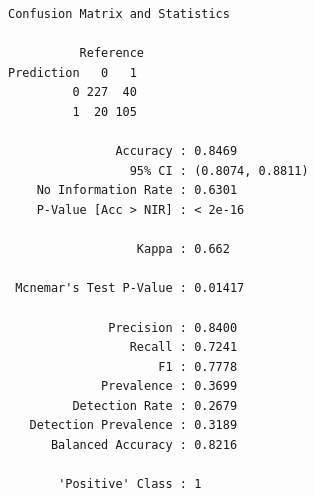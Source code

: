 \documentclass[
  letterpaper,
  DIV=11,
  numbers=noendperiod]{scrartcl}
\begin{document}
\begin{verbatim}
Confusion Matrix and Statistics

          Reference
Prediction   0   1
         0 227  40
         1  20 105
                                          
               Accuracy : 0.8469          
                 95% CI : (0.8074, 0.8811)
    No Information Rate : 0.6301          
    P-Value [Acc > NIR] : < 2e-16         
                                          
                  Kappa : 0.662           
                                          
 Mcnemar's Test P-Value : 0.01417         
                                          
              Precision : 0.8400          
                 Recall : 0.7241          
                     F1 : 0.7778          
             Prevalence : 0.3699          
         Detection Rate : 0.2679          
   Detection Prevalence : 0.3189          
      Balanced Accuracy : 0.8216          
                                          
       'Positive' Class : 1               
                                          
\end{verbatim}
\end{document}
